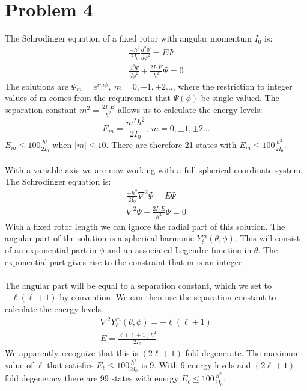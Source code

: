 \documentclass[a4paper,10pt]{article}
\numberwithin{equation}{section}
\begin{document}
\section{Problem 4}
The Schrodinger equation of a fixed rotor with angular momentum $I_0$ is:
\begin{gather}
 \frac{-\hbar ^2}{2I_0}\frac{d^2 \Psi}{d\phi ^2}=E\Psi\\
 \frac{d^2 \Psi}{d\phi ^2}+\frac{2I_0E}{\hbar ^2}\Psi=0
\end{gather}
The solutions are $\Psi_m=e^{i m \phi},\ m=0,\pm 1, \pm2...$, where the restriction to integer values of m comes from the requirement that $\Psi(\phi)$ be single-valued.
The separation constant $m^2=\frac{2I_0E}{\hbar ^2}$ allows us to calculate the energy levels:
\begin{equation}
 E_m=\frac{m^2 \hbar^2}{2I_0},\ m=0,\pm 1, \pm 2...
\end{equation}
$E_m \leq 100\frac{\hbar ^2}{2I_0}$ when $|m|\leq10$. There are therefore 21 states with $E_m \leq 100\frac{\hbar ^2}{2I_0}$.
\\ \\
With a variable axis we are now working with a full spherical coordinate system. The Schrodinger equation is:
\begin{gather}
 \frac{-\hbar^2}{2I_0}\nabla^2\Psi=E\Psi\\
 \nabla^2\Psi+\frac{2I_0E}{\hbar ^2}\Psi=0
\end{gather}
With a fixed rotor length we can ignore the radial part of this solution. 
The angular part of the solution is a spherical harmonic $Y_\ell^m(\theta, \phi)$.
This will consist of an exponential part in $\phi$ and an associated Legendre function in $\theta$.
The exponential part gives rise to the constraint that m is an integer.\\ \\
The angular part will be equal to a separation constant, which we set to $-\ell(\ell+1)$ by convention. 
We can then use the separation constant to calculate the energy levels.
\begin{gather}
 \nabla^2Y_\ell^m(\theta, \phi)=-\ell(\ell+1)\\
 E=\frac{\ell(\ell+1)\hbar^2}{2I_0}
\end{gather}
We apparently recognize that this is $(2\ell+1)$-fold degenerate. 
The maximum value of $\ell$ that satisfies $E_{\ell} \leq 100\frac{\hbar ^2}{2I_0}$ is 9.
With 9 energy levels and $(2\ell+1)$-fold degeneracy there are 99 states with energy $E_{\ell} \leq 100\frac{\hbar ^2}{2I_0}$.
\end{document}
